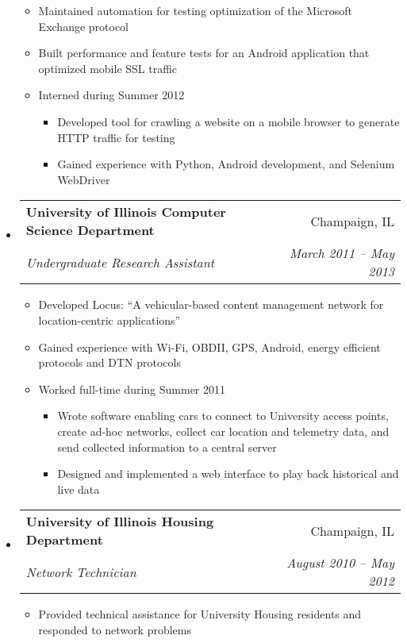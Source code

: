 \documentclass[letterpaper,11pt]{article}
\makeatletter
\newcommand{\resitem}[1]{\item #1 \vspace{-2pt}}
\newcommand{\ressubheading}[4]{
\begin{tabular*}{18.5cm}{l@{\extracolsep{\fill}}r}
		\textbf{#1} & #2 \\
		\textit{#3} & \textit{#4} \\
\end{tabular*}\vspace{-6pt}}
\makeatother
\begin{document}
\begin{itemize}
\begin{itemize}
		\resitem{Maintained automation for testing optimization of the Microsoft Exchange protocol}
		\resitem{Built performance and feature tests for an Android application that optimized mobile SSL traffic}
		\resitem{Interned during Summer 2012}
			\begin{itemize}
				\resitem{Developed tool for crawling a website on a mobile browser to generate HTTP traffic for testing}
				\resitem{Gained experience with Python, Android development, and Selenium WebDriver}
			\end{itemize}
	\end{itemize}
\item
	\ressubheading{University of Illinois Computer Science Department}{Champaign, IL}{Undergraduate Research Assistant}{March 2011 -- May 2013}
	\begin{itemize}
		\resitem{Developed Locus: ``A vehicular-based content management network for location-centric applications''}
		\resitem{Gained experience with Wi-Fi, OBDII, GPS, Android, energy efficient protocols and DTN protocols}
		\resitem{Worked full-time during Summer 2011}
		\begin{itemize}
			\resitem{Wrote software enabling cars to connect to University access points, create ad-hoc networks,
			 collect car location and telemetry data, and send collected information to a central server}
			\resitem{Designed and implemented a web interface to play back historical and live data}
		\end{itemize}
	\end{itemize}
\item
	\ressubheading{University of Illinois Housing Department}{Champaign, IL}{Network Technician}{August 2010 -- May 2012}
	\begin{itemize}
		\resitem{Provided technical assistance for University Housing residents and responded to network problems}
	\end{itemize}

\end{itemize}
\end{document}
